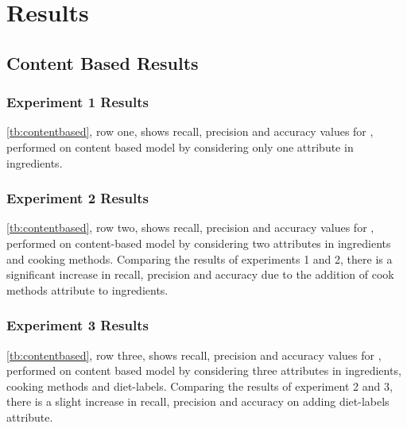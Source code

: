 \chapter{Results}
\label{ch:results}
\section{Content Based Results}
\subsection{Experiment 1 Results}
\autoref{tb:contentbased}, row one, shows recall, precision and accuracy values for , performed on content based model by considering only one attribute in ingredients.

\subsection{Experiment 2 Results}
\autoref{tb:contentbased}, row two, shows recall, precision and accuracy values for , performed on content-based model by considering two attributes in ingredients and cooking methods. Comparing the results of experiments 1 and 2, there is a significant increase in recall, precision and accuracy due to the addition of cook methods attribute to ingredients.

\subsection{Experiment 3 Results}
\autoref{tb:contentbased}, row three, shows recall, precision and accuracy values for , performed on content based model by considering three attributes in ingredients, cooking methods and diet-labels. Comparing the results of experiment 2 and 3, there is a slight increase in recall, precision and accuracy on adding diet-labels attribute.

